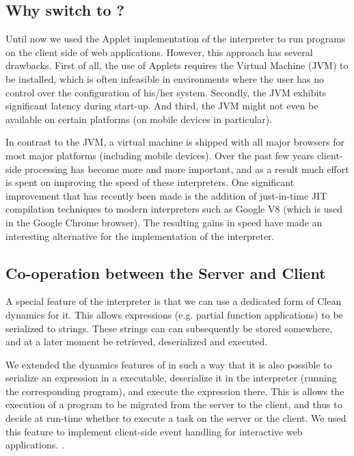\subsection{Why switch to \JS?}
Until now we used the \Java Applet implementation of the \Sapl interpreter to
run \Clean programs on the client side of web applications. However, this
approach has several drawbacks. First of all, the use of \Java Applets requires
the \Java Virtual Machine (\textsf{JVM}) to be installed, which is often infeasible in
environments where the user has no control over the configuration of his/her
system. Secondly, the \textsf{JVM} exhibits significant latency during start-up. And
third, the \textsf{JVM} might not even be available on certain platforms (on mobile
devices in particular).

In contrast to the \textsf{JVM}, a \JavaScript virtual machine is shipped with all major 
browsers for most major platforms (including mobile devices). Over the past few
years client-side processing has become more and more important, and as a result
much effort is spent on improving the speed of these \JS interpreters. One
significant improvement that has recently been made is the addition of
just-in-time \textsf{JIT} compilation techniques to modern \JS interpreters such
as Google V8 (which is used in the Google Chrome browser). The resulting gains
in speed have made \JS an interesting alternative for the implementation of the
\Sapl interpreter.

\subsection{Co-operation between the Server and Client}
A special feature of the \Sapl interpreter is that we can use a dedicated form
of \textsf{Clean} dynamics \cite{DYNAMICS} for it. This allows \Clean expressions (e.g.
partial function applications) to be serialized to strings. These strings can
can subsequently be stored somewhere, and at a later moment be retrieved,
deserialized and executed.

We extended the dynamics features of \Clean in  such a way that it is also
possible to serialize an expression in a \Clean executable, deserialize it
in the \Sapl interpreter (running the corresponding \Sapl program), and execute
the expression there. This is allows the execution of a \Clean program to be
migrated from the server to the client, and thus to decide at run-time whether
to execute a task on the server or the client. We used this feature to
implement client-side event handling for interactive web applications.
\cite{iEditors}. 
